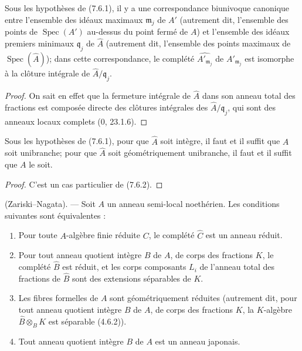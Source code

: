 \begin{corollary}[7.6.2]
\label{IV.2.s7.6.2-fr}
Sous les hypothèses de (7.6.1), il y a une correspondance biunivoque canonique
entre l'ensemble des idéaux maximaux $\mathfrak m_j$ de $A'$ (autrement dit,
l'ensemble des points de $\operatorname{Spec}(A')$ au-dessus du point fermé de
$A$) et l'ensemble des idéaux premiers minimaux $\mathfrak q_j$ de
$\widehat A$ (autrement dit, l'ensemble des points maximaux de
$\operatorname{Spec}(\widehat A)$); dans cette correspondance, le complété
$\widehat{A'_{\mathfrak m_j}}$ de $A'_{\mathfrak m_j}$ est isomorphe à la
clôture intégrale de $\widehat A/\mathfrak q_j$.
\end{corollary}

\begin{proof}
On sait en effet que la fermeture intégrale de $\widehat A$ dans son anneau
total des fractions est composée directe des clôtures intégrales des
$\widehat A/\mathfrak q_j$, qui sont des anneaux locaux complets (0, 23.1.6).
\end{proof}

\begin{corollary}[7.6.3]
\label{IV.2.s7.6.3-fr}
Sous les hypothèses de (7.6.1), pour que $\widehat A$ soit intègre, il faut et
il suffit que $A$ soit unibranche; pour que $\widehat A$ soit géométriquement
unibranche, il faut et il suffit que $A$ le soit.
\end{corollary}

\begin{proof}
C'est un cas particulier de (7.6.2).
\end{proof}

\begin{theorem}[7.6.4]
\label{IV.2.s7.6.4-fr}
(Zariski--Nagata). --- Soit $A$ un anneau semi-local noethérien. Les conditions
suivantes sont équivalentes :
\begin{enumerate}
\item[\emph{a)}] Pour toute $A$-algèbre finie réduite $C$, le complété
$\widehat C$ est un anneau réduit.
\item[\emph{a$'$)}] Pour tout anneau quotient intègre $B$ de $A$, de corps des
fractions $K$, le complété $\widehat B$ est réduit, et les corps composants
$L_i$ de l'anneau total des fractions de $\widehat B$ sont des extensions
séparables de $K$.
\item[\emph{a$''$)}] Les fibres formelles de $A$ sont géométriquement réduites
(autrement dit, pour tout anneau quotient intègre $B$ de $A$, de corps des
fractions $K$, la $K$-algèbre $\widehat B\otimes_BK$ est séparable (4.6.2)).
\item[\emph{b)}] Tout anneau quotient intègre $B$ de $A$ est un anneau
japonais.
\end{enumerate}
\end{theorem}


